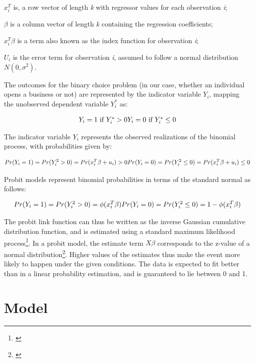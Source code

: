 $x^T_i$ is, a row vector of length \textit{k} with regressor values for each observation \textit{i};

$\beta$ is a column vector of length \textit{k} containing the regression coefficients;

$x^T_i\beta$ is a term also known as the index function for observation \textit{i};

$U_i$ is the error term for observation \textit{i}, assumed to follow a normal distribution $N(0, \sigma^2)$. 


The outcomes for the binary choice problem (in our case, whether an individual opens a business or not) are represented by the indicator variable $Y_i$, mapping the unobserved dependent variable $Y^*_i$ as:

\begin{dmath}
\mbox{$Y_i = 1 \mbox{ if } Y^{*}_{i}>0$} \\
\mbox{$Y_i = 0 \mbox{ if } Y^*_i\leq 0$}
\end{dmath}

The indicator variable $Y_i$ represents the observed realizations of the binomial process, with probabilities given by:

\begin{dmath}
\mbox{$Pr(Y_i = 1) = Pr(Y^2_i > 0) = Pr (x^T_i\beta + u_i) >0 $} \\
\mbox{$Pr(Y_i = 0) = Pr(Y^2_i \leq 0) = Pr (x^T_i\beta + u_i) \leq 0 $}
\end{dmath}

Probit models represent binomial probabilities in terms of the standard normal as follows:

\begin{dmath}
\mbox{$Pr(Y_i = 1) = Pr(Y^2_i > 0) = \phi(x^T_i\beta) $} \\
\mbox{$Pr(Y_i = 0) = Pr(Y^2_i \leq 0) = 1 - \phi(x^T_i\beta) $}
\end{dmath}

The probit link function can thus be written as the inverse Gaussian cumulative distribution function, and is estimated using a standard maximum likelihood process\footnote{\cite{AldrichNelson1984}}. In a probit model, the estimate term $X\beta$ corresponds to the z-value of a normal distribution\footnote{\cite{AldrichNelson1984}}. Higher values of the estimates thus make the event more likely to happen under the given conditions. The data is expected to fit better than in a linear probability estimation, and is guaranteed to lie between 0 and 1. 

\section{Model}

